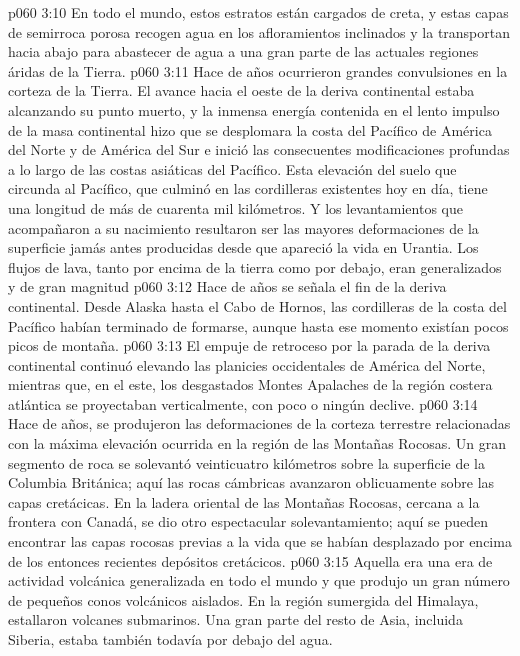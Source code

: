 \vs p060 3:10 En todo el mundo, estos estratos están cargados de creta, y estas capas de semirroca porosa recogen agua en los afloramientos inclinados y la transportan hacia abajo para abastecer de agua a una gran parte de las actuales regiones áridas de la Tierra.
\vs p060 3:11 \pc Hace  de años ocurrieron grandes convulsiones en la corteza de la Tierra. El avance hacia el oeste de la deriva continental estaba alcanzando su punto muerto, y la inmensa energía contenida en el lento impulso de la masa continental hizo que se desplomara la costa del Pacífico de América del Norte y de América del Sur e inició las consecuentes modificaciones profundas a lo largo de las costas asiáticas del Pacífico. Esta elevación del suelo que circunda al Pacífico, que culminó en las cordilleras existentes hoy en día, tiene una longitud de más de cuarenta mil kilómetros. Y los levantamientos que acompañaron a su nacimiento resultaron ser las mayores deformaciones de la superficie jamás antes producidas desde que apareció la vida en Urantia. Los flujos de lava, tanto por encima de la tierra como por debajo, eran generalizados y de gran magnitud
\vs p060 3:12 \pc Hace  de años se señala el fin de la deriva continental. Desde Alaska hasta el Cabo de Hornos, las cordilleras de la costa del Pacífico habían terminado de formarse, aunque hasta ese momento existían pocos picos de montaña.
\vs p060 3:13 El empuje de retroceso por la parada de la deriva continental continuó elevando las planicies occidentales de América del Norte, mientras que, en el este, los desgastados Montes Apalaches de la región costera atlántica se proyectaban verticalmente, con poco o ningún declive.
\vs p060 3:14 \pc Hace  de años, se produjeron las deformaciones de la corteza terrestre relacionadas con la máxima elevación ocurrida en la región de las Montañas Rocosas. Un gran segmento de roca se solevantó veinticuatro kilómetros sobre la superficie de la Columbia Británica; aquí las rocas cámbricas avanzaron oblicuamente sobre las capas cretácicas. En la ladera oriental de las Montañas Rocosas, cercana a la frontera con Canadá, se dio otro espectacular solevantamiento; aquí se pueden encontrar las capas rocosas previas a la vida que se habían desplazado por encima de los entonces recientes depósitos cretácicos.
\vs p060 3:15 Aquella era una era de actividad volcánica generalizada en todo el mundo y que produjo un gran número de pequeños conos volcánicos aislados. En la región sumergida del Himalaya, estallaron volcanes submarinos. Una gran parte del resto de Asia, incluida Siberia, estaba también todavía por debajo del agua.
